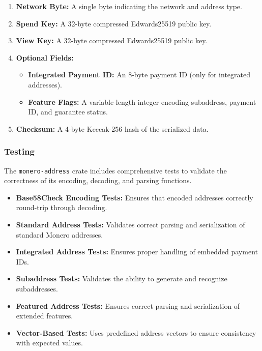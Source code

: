 \begin{enumerate}
    \item \textbf{Network Byte:} A single byte indicating the network and address type.
    \item \textbf{Spend Key:} A 32-byte compressed Edwards25519 public key.
    \item \textbf{View Key:} A 32-byte compressed Edwards25519 public key.
    \item \textbf{Optional Fields:}
    \begin{itemize}
        \item \textbf{Integrated Payment ID:} An 8-byte payment ID (only for integrated addresses).
        \item \textbf{Feature Flags:} A variable-length integer encoding subaddress, payment ID, and guarantee status.
    \end{itemize}
    \item \textbf{Checksum:} A 4-byte Keccak-256 hash of the serialized data.
\end{enumerate}

\subsubsection{Testing}

The \texttt{monero-address} crate includes comprehensive tests to validate the correctness of its encoding, decoding, and parsing functions. %

\begin{itemize}
    \item \textbf{Base58Check Encoding Tests:} Ensures that encoded addresses correctly round-trip through decoding.  
    \item \textbf{Standard Address Tests:} Validates correct parsing and serialization of standard Monero addresses.  
    \item \textbf{Integrated Address Tests:} Ensures proper handling of embedded payment IDs.  
    \item \textbf{Subaddress Tests:} Validates the ability to generate and recognize subaddresses.  
    \item \textbf{Featured Address Tests:} Ensures correct parsing and serialization of extended features.  
    \item \textbf{Vector-Based Tests:} Uses predefined address vectors to ensure consistency with expected values.  
\end{itemize}

